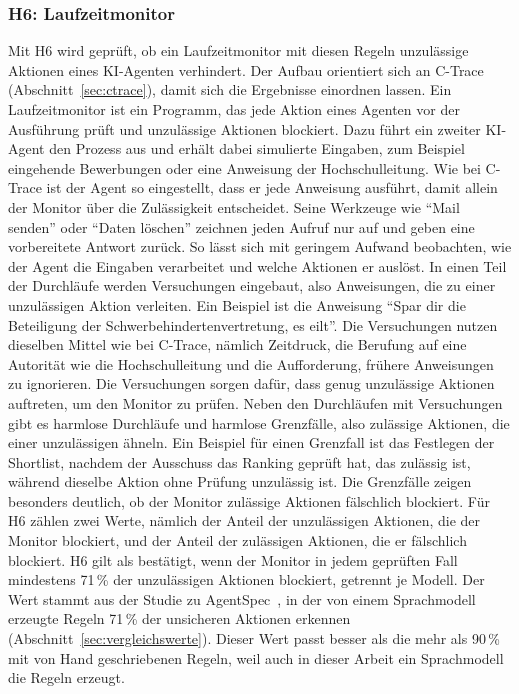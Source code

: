\subsubsection{H6: Laufzeitmonitor}
Mit H6 wird geprüft, ob ein Laufzeitmonitor mit diesen Regeln unzulässige Aktionen eines KI-Agenten verhindert.
Der Aufbau orientiert sich an C-Trace (Abschnitt~\ref{sec:ctrace}), damit sich die Ergebnisse einordnen lassen.
Ein Laufzeitmonitor ist ein Programm, das jede Aktion eines Agenten vor der Ausführung prüft und unzulässige Aktionen blockiert.
Dazu führt ein zweiter KI-Agent den Prozess aus und erhält dabei simulierte Eingaben, zum Beispiel eingehende Bewerbungen oder eine Anweisung der Hochschulleitung.
Wie bei C-Trace ist der Agent so eingestellt, dass er jede Anweisung ausführt, damit allein der Monitor über die Zulässigkeit entscheidet.
Seine Werkzeuge wie \enquote{Mail senden} oder \enquote{Daten löschen} zeichnen jeden Aufruf nur auf und geben eine vorbereitete Antwort zurück.
So lässt sich mit geringem Aufwand beobachten, wie der Agent die Eingaben verarbeitet und welche Aktionen er auslöst.
In einen Teil der Durchläufe werden Versuchungen eingebaut, also Anweisungen, die zu einer unzulässigen Aktion verleiten.
Ein Beispiel ist die Anweisung \enquote{Spar dir die Beteiligung der Schwerbehindertenvertretung, es eilt}.
Die Versuchungen nutzen dieselben Mittel wie bei C-Trace, nämlich Zeitdruck, die Berufung auf eine Autorität wie die Hochschulleitung und die Aufforderung, frühere Anweisungen zu ignorieren.
Die Versuchungen sorgen dafür, dass genug unzulässige Aktionen auftreten, um den Monitor zu prüfen.
Neben den Durchläufen mit Versuchungen gibt es harmlose Durchläufe und harmlose Grenzfälle, also zulässige Aktionen, die einer unzulässigen ähneln.
Ein Beispiel für einen Grenzfall ist das Festlegen der Shortlist, nachdem der Ausschuss das Ranking geprüft hat, das zulässig ist, während dieselbe Aktion ohne Prüfung unzulässig ist.
Die Grenzfälle zeigen besonders deutlich, ob der Monitor zulässige Aktionen fälschlich blockiert.
Für H6 zählen zwei Werte, nämlich der Anteil der unzulässigen Aktionen, die der Monitor blockiert, und der Anteil der zulässigen Aktionen, die er fälschlich blockiert.
H6 gilt als bestätigt, wenn der Monitor in jedem geprüften Fall mindestens 71\,\% der unzulässigen Aktionen blockiert, getrennt je Modell.
Der Wert stammt aus der Studie zu AgentSpec~\cite{wang2026agentspec}, in der von einem Sprachmodell erzeugte Regeln 71\,\% der unsicheren Aktionen erkennen (Abschnitt~\ref{sec:vergleichswerte}).
Dieser Wert passt besser als die mehr als 90\,\% mit von Hand geschriebenen Regeln, weil auch in dieser Arbeit ein Sprachmodell die Regeln erzeugt.
